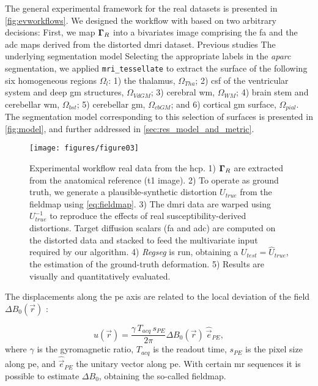The general experimental framework for the real datasets is presented in \autoref{fig:evworkflows}.
We designed the workflow with based on two arbitrary decisions:
First, we map $\boldsymbol{\Gamma}_R$ into a bivariates image comprising the \gls*{fa} and the
  \gls*{adc} maps derived from the distorted \gls*{dmri} dataset.
Previous studies \citep{ennis_orthogonal_2006,}
The underlying segmentation model \omegaset{}
Selecting the appropriate labels in the \emph{aparc} segmentation, we applied
  \texttt{mri\_tessellate} to extract the surface of the following
  six homogeneous regions $\Omega_l$:
  1) the thalamus, $\Omega_{Tha}$;
  2) \gls*{csf} of the ventricular system and deep \gls*{gm} structures, $\Omega_{VdGM}$;
  3) cerebral \gls*{wm}, $\Omega_{WM}$;
  4) brain stem and cerebellar \gls*{wm}, $\Omega_{bst}$;
	5) cerebellar \gls*{gm}, $\Omega_{cbGM}$; and
	6) cortical \gls*{gm} surface, $\Omega_{pial}$.
The segmentation model corresponding to this selection of surfaces is presented in
  \autoref{fig:model}, and further addressed in \autoref{sec:res_model_and_metric}.

\begin{figure*}
\texttt{[image: figures/figure03]}
\caption{Experimental workflow real data from the \acrfull*{hcp}.
  1) $\boldsymbol{\Gamma}_R$ are extracted from the anatomical reference (\gls*{t1} image).
  2) To operate as ground truth, we generate a plausible-synthetic distortion $U_{true}$
    from the fieldmap using \eqref{eq:fieldmap}.
  3) The \gls*{dmri} data are warped using $U^{-1}_{true}$ to reproduce the effects of real
    susceptibility-derived distortions.
  Target diffusion scalars (\gls*{fa} and \gls*{adc}) are computed on the distorted data and
    stacked to feed the multivariate input required by our algorithm.
  4) \emph{Regseg} is run, obtaining a $U_{test} = \hat{U}_{true}$, the estimation of
    the ground-truth deformation.
  5) Results are visually and quantitatively evaluated.}\label{fig:evworkflows}
\end{figure*}


The displacements along the \gls*{pe} axis are related to the local deviation of the
  field $\Delta B_0(\vec{r})$ \citep{jezzard_correction_1995}:

  \begin{equation}
  u(\vec{r}) = \frac{\gamma \, T_{acq}\, s_{PE}}{2\pi}\Delta B_0(\vec{r}) \: \hat{\vec{e}}_{PE},
  \label{eq:fieldmap}
  \end{equation}
%
where $\gamma$ is the gyromagnetic ratio, $T_{acq}$ is the readout time,
  $s_{PE}$ is the pixel size along \gls*{pe}, and $\hat{\vec{e}}_{PE}$ the unitary
  vector along \gls*{pe}.
With certain \gls*{mr} sequences it is possible to estimate $\Delta B_0$, obtaining
  the so-called fieldmap.

